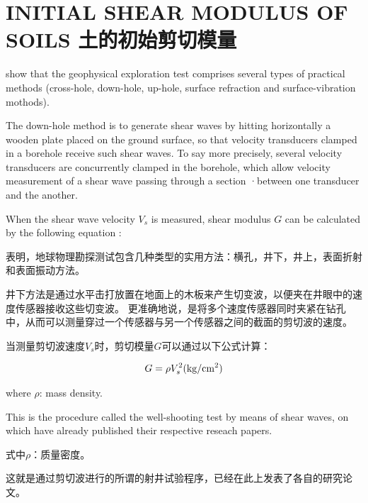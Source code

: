 \section{INITIAL SHEAR MODULUS OF SOILS 土的初始剪切模量}


\begin{paracol}{2}
    
    \citet{Miller1972545}  show that the geophysical exploration test comprises several types of practical methods (cross-hole, down-hole, up-hole, surface refraction and surface-vibration mothods).
    
    The down-hole method is to generate shear waves by hitting horizontally a wooden plate placed on the ground surface, so that velocity transducers clamped in a borehole receive such shear waves. To say more precisely, several velocity transducers are concurrently clamped in the borehole, which allow velocity measurement of a shear wave passing through a section ·between one transducer and the another.
    
    When the shear wave velocity $V_s$ is measured, shear modulus $G$ can be calculated by the following equation :

    \switchcolumn

    \citet{Miller1972545}表明，地球物理勘探测试包含几种类型的实用方法：横孔，井下，井上，表面折射和表面振动方法。
    
    井下方法是通过水平击打放置在地面上的木板来产生切变波，以便夹在井眼中的速度传感器接收这些切变波。 更准确地说，是将多个速度传感器同时夹紧在钻孔中，从而可以测量穿过一个传感器与另一个传感器之间的截面的剪切波的速度。
    
    当测量剪切波速度$V_s$时，剪切模量$G$可以通过以下公式计算：

\end{paracol}
    
    \begin{align}
        G=\rho{}V_s^2(\rm{kg/cm^2})
        \label{equation:1}
    \end{align}

\begin{paracol}{2}
    \noindent where $\rho$: mass density.

    This is the procedure called the well-shooting test by means of shear waves, on which \citet{Kitsunezaki19671,Shima19681301, Shima1969819, Imai197017} have already published their respective reseach papers.

    \switchcolumn

    \noindent 式中$\rho$：质量密度。

    这就是通过剪切波进行的所谓的射井试验程序，\citet{Kitsunezaki19671,Shima19681301, Shima1969819, Imai197017}已经在此上发表了各自的研究论文。

\end{paracol}

